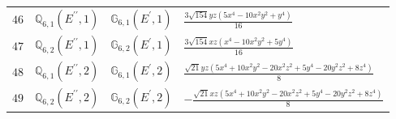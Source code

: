 \documentclass[fleqn,8pt,landscape]{jsarticle}
\begin{document}
\begin{table}[ht!]
\begin{center}
\begin{tabular}{cccl}
$ 46 $ & $ \mathbb{Q}_{6,1}(E^{\prime\prime},1) $ & $ \mathbb{G}_{6,1}(E^{\prime},1) $ & $ \frac{3 \sqrt{154} y z \left(5 x^{4} - 10 x^{2} y^{2} + y^{4}\right)}{16} $ \\
$ 47 $ & $ \mathbb{Q}_{6,2}(E^{\prime\prime},1) $ & $ \mathbb{G}_{6,2}(E^{\prime},1) $ & $ \frac{3 \sqrt{154} x z \left(x^{4} - 10 x^{2} y^{2} + 5 y^{4}\right)}{16} $ \\
$ 48 $ & $ \mathbb{Q}_{6,1}(E^{\prime\prime},2) $ & $ \mathbb{G}_{6,1}(E^{\prime},2) $ & $ \frac{\sqrt{21} y z \left(5 x^{4} + 10 x^{2} y^{2} - 20 x^{2} z^{2} + 5 y^{4} - 20 y^{2} z^{2} + 8 z^{4}\right)}{8} $ \\
$ 49 $ & $ \mathbb{Q}_{6,2}(E^{\prime\prime},2) $ & $ \mathbb{G}_{6,2}(E^{\prime},2) $ & $ - \frac{\sqrt{21} x z \left(5 x^{4} + 10 x^{2} y^{2} - 20 x^{2} z^{2} + 5 y^{4} - 20 y^{2} z^{2} + 8 z^{4}\right)}{8} $ \\
 \hline \hline
\end{tabular}
\end{center}
\end{table}
\end{document}
